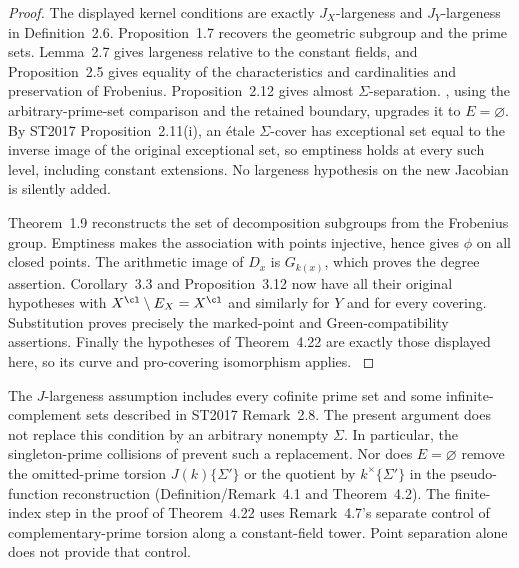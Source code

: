 \begin{proof}
The displayed kernel conditions are exactly $J_X$-largeness and
$J_Y$-largeness in Definition~2.6. Proposition~1.7 recovers the
geometric subgroup and the prime sets. Lemma~2.7 gives largeness
relative to the constant fields, and Proposition~2.5 gives equality
of the characteristics and cardinalities and preservation of
Frobenius. Proposition~2.12 gives almost $\Sigma$-separation.
, using the arbitrary-prime-set comparison
 and the retained boundary, upgrades it to
$E=\varnothing$. By ST2017 Proposition~2.11(i), an \'etale
$\Sigma$-cover has exceptional set equal to the inverse image of
the original exceptional set, so emptiness holds at every such
level, including constant extensions. No largeness hypothesis on
the new Jacobian is silently added.

Theorem~1.9 reconstructs the set of decomposition subgroups from
the Frobenius group. Emptiness makes the association with points
injective, hence gives $\phi$ on all closed points. The arithmetic
image of $D_x$ is $G_{k(x)}$, which proves the degree assertion.
Corollary~3.3 and Proposition~3.12 now have all their original
hypotheses with $X^{\cl}\setminus E_X=X^{\cl}$ and similarly
for $Y$ and for every covering. Substitution proves precisely the
marked-point and Green-compatibility assertions. Finally the
hypotheses of Theorem~4.22 are exactly those displayed here,
so its curve and pro-covering isomorphism applies.
\citep[Proposition~1.7, Theorem~1.9, Proposition~2.5,
Lemma~2.7, Propositions~2.11--2.12, Corollary~3.3,
Proposition~3.12, Theorem~4.22]{LA_ST2017}
\end{proof}

The $J$-largeness assumption includes every cofinite prime set and
some infinite-complement sets described in ST2017 Remark~2.8.
The present argument does not replace this condition by an arbitrary
nonempty $\Sigma$. In particular, the singleton-prime collisions
of  prevent such a replacement. Nor does
$E=\varnothing$ remove the omitted-prime torsion
$J(k)\{\Sigma'\}$ or the quotient by
$k^\times\{\Sigma'\}$ in the pseudo-function reconstruction
(Definition/Remark~4.1 and Theorem~4.2). The finite-index step in
the proof of Theorem~4.22 uses Remark~4.7's separate control of
complementary-prime torsion along a constant-field tower. Point
separation alone does not provide that control.

